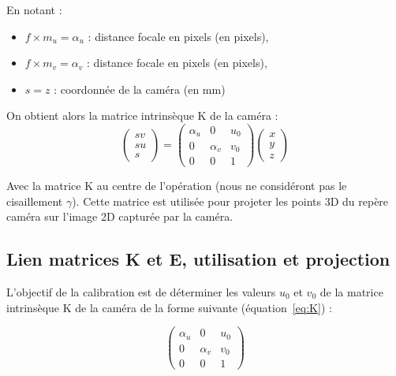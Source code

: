 \documentclass[12pt]{article}
\begin{document}
En notant :
\begin{itemize}
    \item $f \times m_{u} = \alpha_u$ : distance focale en pixels (en pixels),
    \item $f \times m_{v} = \alpha_v$ : distance focale en pixels (en pixels),
    \item $s = z$ : coordonnée de la caméra (en mm)
\end{itemize}

On obtient alors la matrice intrinsèque K de la caméra :
\begin{equation}
    \begin{pmatrix}
    sv \\
    su \\
    s
    \end{pmatrix} = 
    \begin{pmatrix}
    \alpha_u & 0 & u_0 \\
    0 & \alpha_v & v_0 \\
    0 & 0 & 1
    \end{pmatrix}
    \begin{pmatrix}
    x \\
    y \\
    z
    \end{pmatrix}
\end{equation}

Avec la matrice K au centre de l'opération (nous ne considéront pas le cisaillement $\gamma$).
Cette matrice est utilisée pour projeter les points 3D du repère caméra sur l'image 2D capturée par la caméra.

\subsection{Lien matrices K et E, utilisation et projection}

L'objectif de la calibration est de déterminer les valeurs $u_0$ et $v_0$ de la matrice intrinsèque K de la caméra de la forme suivante (équation~\ref{eq:K}) :

\begin{equation}
\begin{pmatrix}
\alpha_{u} & 0 & u_0 \\
0 & \alpha_{v} & v_0 \\
0 & 0 & 1
\end{pmatrix}
\label{eq:K}
\end{equation}
\end{document}
